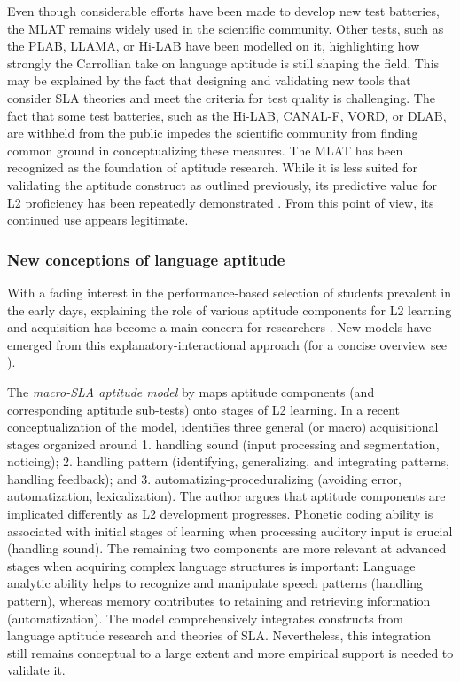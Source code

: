 \documentclass[output=paper]{langscibook}
\begin{document}
Even though considerable efforts have been made to develop new test batteries, the MLAT remains widely used in the scientific community. Other tests, such as the PLAB, LLAMA, or Hi-LAB have been modelled on it, highlighting how strongly the Carrollian take on language aptitude is still shaping the field. This may be explained by the fact that designing and validating new tools that consider SLA theories and meet the criteria for test quality is challenging. The fact that some test batteries, such as the Hi-LAB, CANAL-F, VORD, or DLAB, are withheld from the public \citep{AmeringerEtAl2019} impedes the scientific community from finding common ground in conceptualizing these measures. The MLAT has been recognized as the foundation of aptitude research. While it is less suited for validating the aptitude construct as outlined previously, its predictive value for L2 proficiency has been repeatedly demonstrated \citep{Li2016}. From this point of view, its continued use appears legitimate.

\subsubsection{New conceptions of language aptitude}\label{sec:01:2.1.3}%

With a fading interest in the performance-based selection of students prevalent in the early days, explaining the role of various aptitude components for L2 learning and acquisition has become a main concern for researchers \citep{Li2019}. New models have emerged from this explanatory-interactional approach (for a concise overview see \citealt{WenEtAl2017}).

The \textit{macro-SLA aptitude model} by \citet{Skehan2002, Skehan2019} maps aptitude components (and corresponding aptitude sub-tests) onto stages of L2 learning. In a recent conceptualization of the model, \citet{Skehan2019} identifies three general (or macro) acquisitional stages organized around 1. handling sound (input processing and segmentation, noticing); 2. handling pattern (identifying, generalizing, and integrating patterns, handling feedback); and 3. automatizing-pro\-ce\-du\-ra\-liz\-ing (avoiding error, automatization, lexicalization). The author argues that aptitude components are implicated differently as L2 development progresses. Phonetic coding ability is associated with initial stages of learning when processing auditory input is crucial (handling sound). The remaining two components are more relevant at advanced stages when acquiring complex language structures is important: Language analytic ability helps to recognize and manipulate speech patterns (handling pattern), whereas memory contributes to retaining and retrieving information (automatization). The model comprehensively integrates constructs from language aptitude research and theories of SLA. Nevertheless, this integration still remains conceptual to a large extent and more empirical support is needed to validate it. 
\end{document}
